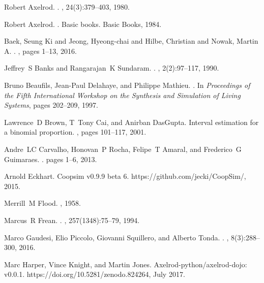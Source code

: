 \documentclass[10pt,letterpaper]{article}
\begin{document}
\begin{thebibliography}{10}
Robert Axelrod.
.
, 24(3):379--403, 1980.

Robert Axelrod.
.
\newblock Basic books. Basic Books, 1984.

{Baek, Seung Ki and Jeong, Hyeong-chai and Hilbe, Christian and Nowak, Martin
  A}.
.
, pages 1--13, 2016.

Jeffrey~S Banks and Rangarajan~K Sundaram.
.
, 2(2):97--117, 1990.

Bruno Beaufils, Jean-Paul Delahaye, and Philippe Mathieu.
.
\newblock In {\em Proceedings of the Fifth International Workshop on the
  Synthesis and Simulation of Living Systems}, pages 202--209, 1997.

Lawrence~D Brown, T~Tony Cai, and Anirban DasGupta.
\newblock Interval estimation for a binomial proportion.
, pages 101--117, 2001.

Andre~LC Carvalho, Honovan~P Rocha, Felipe~T Amaral, and Frederico~G Guimaraes.
.
\newblock pages 1--6, 2013.

Arnold Eckhart.
\newblock Coopsim v0.9.9 beta 6.
\newblock https://github.com/jecki/CoopSim/, 2015.

Merrill~M Flood.
, 1958.

Marcus~R Frean.
.
, 257(1348):75--79, 1994.

Marco Gaudesi, Elio Piccolo, Giovanni Squillero, and Alberto Tonda.
.
, 8(3):288--300, 2016.

Marc Harper, Vince Knight, and Martin Jones.
\newblock Axelrod-python/axelrod-dojo: v0.0.1.
\newblock https://doi.org/10.5281/zenodo.824264, July 2017.


\end{thebibliography}
\end{document}
